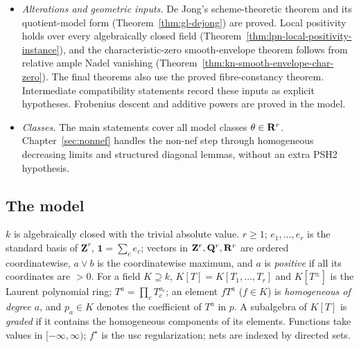 \begin{itemize}
scalars of divisorial valuation rings instead of base ideals of test configurations.
\item \emph{Alterations and geometric inputs.} De Jong's scheme-theoretic theorem and
its quotient-model form (Theorem~\ref{thm:gl-dejong}) are proved. Local positivity holds over
every algebraically closed field (Theorem~\ref{thm:lpn-local-positivity-instance}), and the
characteristic-zero smooth-envelope theorem follows from relative ample Nadel vanishing
(Theorem~\ref{thm:kn-smooth-envelope-char-zero}). The final theorems also use the proved
fibre-constancy theorem. Intermediate compatibility statements record these inputs as explicit
hypotheses. Frobenius descent and additive powers are proved in the model.
\item \emph{Classes.} The main statements cover all model classes $\theta\in\mathbf{R}^r$.
Chapter~\ref{sec:nonnef} handles the non-nef step through homogeneous decreasing limits and
structured diagonal lemmas, without an extra PSH2 hypothesis.
\end{itemize}

\subsection{The model}\label{subsec:gl-model}

\begin{convention}\label{conv:gl-setting}
\leanok
{}
$k$ is algebraically closed with the trivial absolute value. $r\ge1$; $e_1,\dots,e_r$ is the standard basis of
$\mathbf Z^r$, $\mathbf 1=\sum_ce_c$; vectors in $\mathbf Z^r,\mathbf{Q}^r,\mathbf{R}^r$ are ordered coordinatewise, $a\vee b$ is the
coordinatewise maximum, and $a$ is \emph{positive} if all its coordinates are $>0$. For a field $K\supseteq k$,
$K[T]=K[T_1,\dots,T_r]$ and $K[T^{\pm}]$ is the Laurent polynomial ring; $T^a=\prod_cT_c^{a_c}$; an element $fT^a$ ($f\in K$)
is \emph{homogeneous of degree $a$}, and $p_a\in K$ denotes the coefficient of $T^a$ in $p$. A subalgebra of $K[T]$ is
\emph{graded} if it contains the homogeneous components of its elements. Functions take values in $[-\infty,\infty)$;
$f^\star$ is the usc regularization; nets are indexed by directed sets.
\end{convention}

